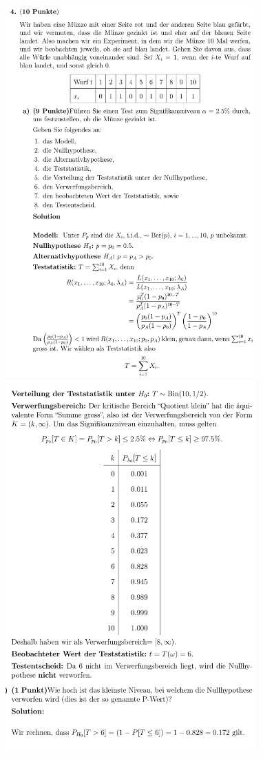 \includegraphics[height=143mm]{old_exams_prtsrc/tei_infk_so17_ml-12.png}\newline
\includegraphics[height=143mm]{old_exams_prtsrc/tei_infk_so17_ml-13.png}\newline

